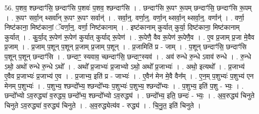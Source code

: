\documentclass[17pt]{extarticle}
\begin{document}
56. प॒शव॒ श्छन्दाꣳ॑सि॒ छन्दाꣳ॑सि प॒शवः॑ प॒शव॒ श्छन्दाꣳ॑सि । . छन्दाꣳ॑सि रू॒पꣳ रू॒पम् छन्दाꣳ॑सि॒ छन्दाꣳ॑सि रू॒पम् । . रू॒पꣳ सर्वा॒न् थ्सर्वा᳚न् रू॒पꣳ रू॒पꣳ सर्वान्॑ । . सर्वा॒न्॒. वर्णा॒न्॒. वर्णा॒न् थ्सर्वा॒न् थ्सर्वा॒न्॒. वर्णान्॑ । . वर्णा॒ निष्ट॑काना॒ मिष्ट॑कानां॒ ॅवर्णा॒न्॒. वर्णा॒ निष्ट॑कानाम् । . इष्ट॑कानाम् कुर्यात् कुर्या॒ दिष्ट॑काना॒ मिष्ट॑कानाम् कुर्यात् । . कु॒र्या॒द् रू॒पेण॑ रू॒पेण॑ कुर्यात् कुर्याद् रू॒पेण॑ । . रू॒पेणै॒ वैव रू॒पेण॑ रू॒पेणै॒व । . ए॒व प्र॒जाम् प्र॒जा मे॒वैव प्र॒जाम् । . प्र॒जाम् प॒शून् प॒शून् प्र॒जाम् प्र॒जाम् प॒शून् । . प्र॒जामिति॑ प्र - जाम् । . प॒शून् छन्दाꣳ॑सि॒ छन्दाꣳ॑सि प॒शून् प॒शून् छन्दाꣳ॑सि । . छन्दाꣳ॒॒ स्यवाव॒ च्छन्दाꣳ॑सि॒ छन्दाꣳ॒॒स्यव॑ । . अव॑ रुन्धे रु॒न्धे ऽवाव॑ रुन्धे । . रु॒न्धे ऽथो॒ अथो॑ रुन्धे रु॒न्धे ऽथो᳚ । . अथो᳚ प्र॒जाभ्यः॑ प्र॒जाभ्यो ऽथो॒ अथो᳚ प्र॒जाभ्यः॑ । . अथो॒ इत्यथो᳚ । . प्र॒जाभ्य॑ ए॒वैव प्र॒जाभ्यः॑ प्र॒जाभ्य॑ ए॒व । . प्र॒जाभ्य॒ इति॑ प्र - जाभ्यः॑ । . ए॒वैन॑ मेन मे॒वै वैन᳚म् । . ए॒न॒म् प॒शुभ्यः॑ प॒शुभ्य॑ एन मेनम् प॒शुभ्यः॑ । . प॒शुभ्य॒ श्छन्दो᳚भ्य॒ श्छन्दो᳚भ्यः प॒शुभ्यः॑ प॒शुभ्य॒ श्छन्दो᳚भ्यः । . प॒शुभ्य॒ इति॑ प॒शु - भ्यः॒ । . छन्दो᳚भ्यो ऽव॒रुद्ध्या॑ व॒रुद्ध्य॒ छन्दो᳚भ्य॒ श्छन्दो᳚भ्यो ऽव॒रुद्ध्य॑ । . छन्दो᳚भ्य॒ इति॒ छन्दः॑ - भ्यः॒ । . अ॒व॒रुद्ध्य॑ चिनुते चिनुते ऽव॒रुद्ध्या॑ व॒रुद्ध्य॑ चिनुते । . अ॒व॒रुद्ध्येत्य॑व - रुद्ध्य॑ । . चि॒नु॒त॒ इति॑ चिनुते । \newline
\end{document}
